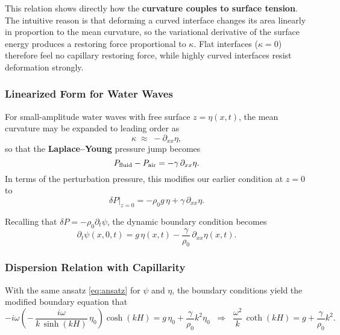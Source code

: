 \begin{remark}
This relation shows directly how the \textbf{curvature couples to surface tension}. The intuitive reason is that deforming a curved interface changes its area linearly in proportion to the mean curvature, so the variational derivative of the surface energy produces a restoring force proportional to $\kappa$. Flat interfaces ($\kappa=0$) therefore feel no capillary restoring force, while highly curved interfaces resist deformation strongly.
\end{remark}

\subsubsection*{Linearized Form for Water Waves}

For small-amplitude water waves with free surface $z=\eta(x,t)$, the mean curvature may be expanded to leading order as
\[
\kappa \;\approx\; -\partial_{xx}\eta,
\]
so that the \textbf{Laplace--Young} pressure jump becomes
\begin{equation}
P_{\rm fluid} - P_{\rm air} = -\gamma \,\partial_{xx}\eta.
\end{equation}
In terms of the perturbation pressure, this modifies our earlier condition at $z=0$ to
\begin{equation}
\delta P|_{z=0} = -\rho_0 g \,\eta + \gamma\,\partial_{xx}\eta.
\end{equation}

Recalling that $\delta P = -\rho_0 \partial_t \psi$, the dynamic boundary condition becomes
\begin{equation}
\partial_t \psi(x,0,t) = g\,\eta(x,t) - \frac{\gamma}{\rho_0}\,\partial_{xx}\eta(x,t).
\label{eq:dynBC_capillary}
\end{equation}

\subsubsection*{Dispersion Relation with Capillarity}

With the same ansatz \eqref{eq:ansatz} for $\psi$ and $\eta$, the boundary conditions yield the modified boundary equation that
\begin{equation}
-i\omega \left(-\,\frac{i\omega}{k\,\sinh(kH)}\,\eta_0\right)\cosh(kH)=g\,\eta_0 + \frac{\gamma}{\rho_0} k^2\eta_0
\;\;\Rightarrow\;\;
\frac{\omega^2}{k}\,\coth(kH)=g + \frac{\gamma}{\rho_0}k^2.
\end{equation}

